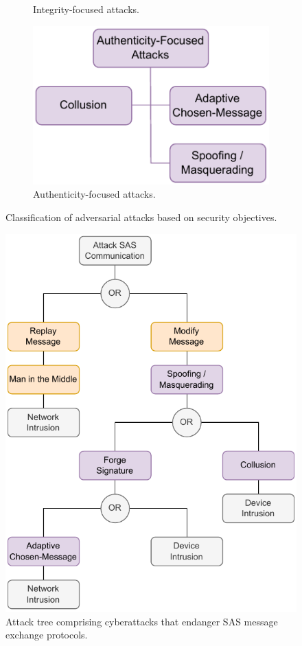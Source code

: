 \begin{figure}
\begin{subfigure}[t]{0.295\linewidth}
        \caption{Integrity-focused attacks.}
        \label{fig:attacks_integrity}
    \end{subfigure}
    \hfill
    \begin{subfigure}[t]{0.30\linewidth}
        \centering
        \includegraphics[width=\linewidth]{figures/attacks_authenticity.drawio.pdf}
        \caption{Authenticity-focused attacks.}
        \label{fig:attacks_authenticity}
    \end{subfigure}
    \caption{Classification of adversarial attacks based on security objectives.}
    \label{fig:attack_classification}
\end{figure}
\begin{figure}
    \centering
    \includegraphics[width=0.5\linewidth]{figures/attack_tree_communication.drawio.pdf}
    \caption{Attack tree comprising cyberattacks that endanger SAS message exchange protocols.}
    \label{fig:attack_tree_communication}
\end{figure}
